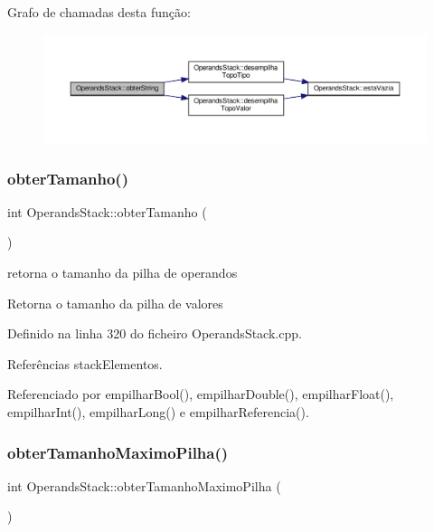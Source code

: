 Grafo de chamadas desta função\+:
\nopagebreak
\begin{figure}[H]
\begin{center}
\leavevmode
\includegraphics[width=350pt]{classOperandsStack_a32ad6a1ea26c02cf709fed1e86412b4a_cgraph}
\end{center}
\end{figure}
\mbox{\label{classOperandsStack_a6ea316fc2b2503af2175fada4d4a9741}} 
\subsubsection{\texorpdfstring{obter\+Tamanho()}{obterTamanho()}}
{\footnotesize\ttfamily int Operands\+Stack\+::obter\+Tamanho (\begin{DoxyParamCaption}{ }\end{DoxyParamCaption})}



retorna o tamanho da pilha de operandos 

Retorna o tamanho da pilha de valores 

Definido na linha 320 do ficheiro Operands\+Stack.\+cpp.



Referências stack\+Elementos.



Referenciado por empilhar\+Bool(), empilhar\+Double(), empilhar\+Float(), empilhar\+Int(), empilhar\+Long() e empilhar\+Referencia().

\mbox{\label{classOperandsStack_a834d4e49d01388abf37582f95d66b40e}} 
\subsubsection{\texorpdfstring{obter\+Tamanho\+Maximo\+Pilha()}{obterTamanhoMaximoPilha()}}
{\footnotesize\ttfamily int Operands\+Stack\+::obter\+Tamanho\+Maximo\+Pilha (\begin{DoxyParamCaption}{ }\end{DoxyParamCaption})}




